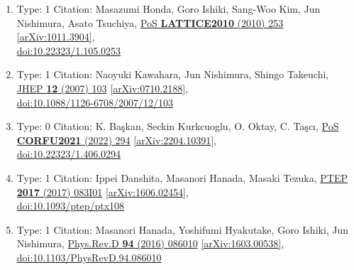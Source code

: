 \documentclass[a4paper,10pt]{article}
\begin{document}
\begin{enumerate}
\begin{enumerate}
  \item Type: 1 Citation: Masazumi Honda, Goro Ishiki, Sang-Woo Kim, Jun Nishimura, Asato Tsuchiya, \href{https://www.doi.org/10.22323/1.105.0253}{PoS {\bf LATTICE2010} (2010) 253}  \href{https://arxiv.org/abs/1011.3904}{[arXiv:1011.3904]},\\\href{https://www.doi.org/10.22323/1.105.0253}{doi:10.22323/1.105.0253}
  \item Type: 1 Citation: Naoyuki Kawahara, Jun Nishimura, Shingo Takeuchi, \href{https://www.doi.org/10.1088/1126-6708/2007/12/103}{JHEP {\bf 12} (2007) 103}  \href{https://arxiv.org/abs/0710.2188}{[arXiv:0710.2188]},\\\href{https://www.doi.org/10.1088/1126-6708/2007/12/103}{doi:10.1088/1126-6708/2007/12/103}
  \item Type: 0 Citation: K. Başkan, Seckin Kurkcuoglu, O. Oktay, C. Taşcı, \href{https://www.doi.org/10.22323/1.406.0294}{PoS {\bf CORFU2021} (2022) 294}  \href{https://arxiv.org/abs/2204.10391}{[arXiv:2204.10391]},\\\href{https://www.doi.org/10.22323/1.406.0294}{doi:10.22323/1.406.0294}
  \item Type: 1 Citation: Ippei Danshita, Masanori Hanada, Masaki Tezuka, \href{https://www.doi.org/10.1093/ptep/ptx108}{PTEP {\bf 2017} (2017) 083I01}  \href{https://arxiv.org/abs/1606.02454}{[arXiv:1606.02454]},\\\href{https://www.doi.org/10.1093/ptep/ptx108}{doi:10.1093/ptep/ptx108}
  \item Type: 1 Citation: Masanori Hanada, Yoshifumi Hyakutake, Goro Ishiki, Jun Nishimura, \href{https://www.doi.org/10.1103/PhysRevD.94.086010}{Phys.Rev.D {\bf 94} (2016) 086010}  \href{https://arxiv.org/abs/1603.00538}{[arXiv:1603.00538]},\\\href{https://www.doi.org/10.1103/PhysRevD.94.086010}{doi:10.1103/PhysRevD.94.086010}

\end{enumerate}
\end{enumerate}
\end{document}
